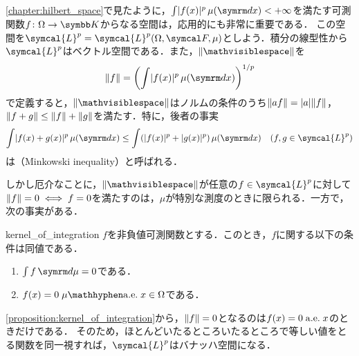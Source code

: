 \documentclass[../../main]{subfiles}
\begin{document}
\cref{chapter:hilbert_space}で見たように，\(\int\abs{f(x)}^p\measured[x]{\mu}<+\infty\)を満たす可測関数\(f\colon\Omega\to\numset{K}\)からなる空間は，応用的にも非常に重要である．
この空間を\(\symcal{L}^p=\symcal{L}^p(\Omega,\sigmaalg{F},\mu)\)としよう．積分の線型性から\(\symcal{L}^p\)はベクトル空間である．また，\(\vnorm{\holder}\)を
\[
  \vnorm{f} = \pqty*{\int\abs{f(x)}^p\measured[x]{\mu}}^{1/p}
\]
で定義すると，\(\vnorm{\holder}\)はノルムの条件のうち\(\lVert af\rVert=\lvert a\rvert\lVert f\rVert\)，\(\lVert f+g\rVert\leq\lVert f\rVert+\lVert g\rVert\)を満たす．特に，後者の事実
\[
  \int\abs{f(x)+g(x)}^p\measured[x]{\mu} \leq \int(\abs{f(x)}^p+\abs{g(x)}^p)\measured[x]{\mu}\quad(f,g\in\symcal{L}^p)
\]
は（Minkowski inequality）と呼ばれる．

しかし厄介なことに，\(\vnorm{\holder}\)が任意の\(f\in\symcal{L}^p\)に対して\(\lVert f\rVert=0\iff f=0\)を満たすのは，\(\mu\)が特別な測度のときに限られる．一方で，次の事実がある．

\begin{proposition}{}{kernel_of_integration}
  \(f\)を非負値可測関数とする．このとき，\(f\)に関する以下の条件は同値である．
  \begin{enumerate}
    \item \(\int f\measured{\mu}=0\)である．
    \item \(f(x)=0\almosteverywhere[\mu]x\in\Omega\)である．
  \end{enumerate}
\end{proposition}

\cref{proposition:kernel_of_integration}から，\(\lVert f\rVert=0\)となるのは\(f(x)=0\almosteverywhere x\)のときだけである．
そのため，ほとんどいたるところいたるところで等しい値をとる関数を同一視すれば，\(\symcal{L}^p\)はバナッハ空間になる．

\end{document}

